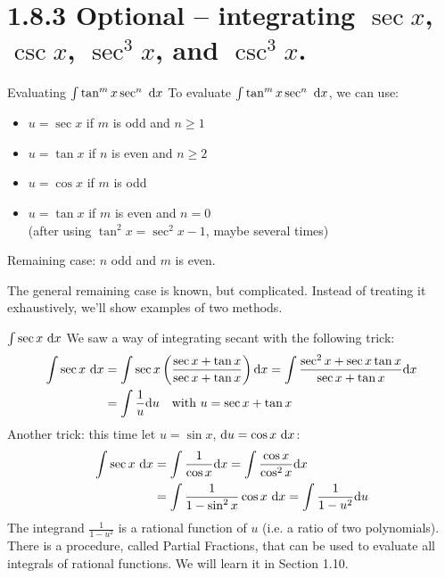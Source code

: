 \section{1.8.3 Optional -- integrating  $\sec x$, $\csc x$, $\sec^3 x$, and $\csc^3 x$.}
\begin{frame}[t]\AnswerSpace
\label{note1.8.3a}
\begin{block}{Evaluating $\int \tan^m x \sec^n ~\text{d} x$}
To evaluate $\int \tan^m x \sec^n ~\text{d} x$, we can use:
\begin{itemize}
	\item $u=\sec x$ if $m$ is odd and $n \ge 1$
	\item $u=\tan x$ if $n$ is even and $n \ge 2$
	\item $u=\cos x$ if $m$ is odd
	\item $u=\tan x$ if $m$ is even and $n=0$\\ (after using $\tan^2 x = \sec^2 x - 1$, maybe several times)
\end{itemize} 
\end{block}
Remaining case: $n$ odd and $m$ is even.\vfill\pause

The general remaining case is known, but complicated. Instead of treating it exhaustively, we'll show examples of two methods.
\end{frame}
\begin{frame}[t]{$\int\sec x\ \textup{\text{d}} x$}
\AnswerSpace
{}
We saw a way of integrating secant with the following trick:
\begin{align*}\int \sec x \ \text{d} x &= \int\sec x\left(\frac{\sec x+ \tan x}{\sec x +\tan x}\right) \text{d} x
= \int\frac{\sec^2 x + \sec x \tan x}{\sec x + \tan x}\text{d} x\\ &= \int\frac{1}{u}\text{d} u\quad
\text{with }u=\sec x + \tan x
\end{align*} 
Another trick: this time let $u=\sin x $, $\text{d} u = \cos x \ \text{d} x$:\pause
\begin{align*}
\int \sec x \ \text{d} x &=\int\frac{1}{\cos x}\text{d} x =\int\frac{\cos x}{\cos^2 x}\text{d} x\\
&=\int\frac{1}{1-\sin^2 x}\cos x \ \text{d} x=\int\frac{1}{1-u^2}\text{d} u
\end{align*}
The integrand $\frac{1}{1-u^2}$ is a rational function of $u$ (i.e. a ratio of two polynomials). There is a procedure, called Partial Fractions, that can be used to evaluate all integrals of rational functions. We will learn it in Section 1.10.
\end{frame}
